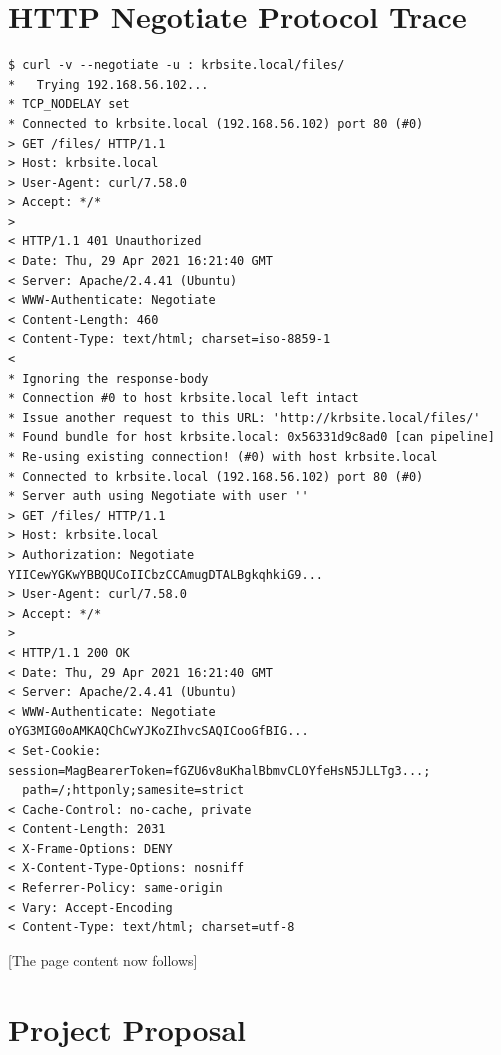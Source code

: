 \documentclass[12pt]{report}
\begin{document}
\chapter{HTTP Negotiate Protocol Trace}
\label{sec:appendix4}

\begin{verbatim}
$ curl -v --negotiate -u : krbsite.local/files/
*   Trying 192.168.56.102...
* TCP_NODELAY set
* Connected to krbsite.local (192.168.56.102) port 80 (#0)
> GET /files/ HTTP/1.1
> Host: krbsite.local
> User-Agent: curl/7.58.0
> Accept: */*
>
< HTTP/1.1 401 Unauthorized
< Date: Thu, 29 Apr 2021 16:21:40 GMT
< Server: Apache/2.4.41 (Ubuntu)
< WWW-Authenticate: Negotiate
< Content-Length: 460
< Content-Type: text/html; charset=iso-8859-1
<
* Ignoring the response-body
* Connection #0 to host krbsite.local left intact
* Issue another request to this URL: 'http://krbsite.local/files/'
* Found bundle for host krbsite.local: 0x56331d9c8ad0 [can pipeline]
* Re-using existing connection! (#0) with host krbsite.local
* Connected to krbsite.local (192.168.56.102) port 80 (#0)
* Server auth using Negotiate with user ''
> GET /files/ HTTP/1.1
> Host: krbsite.local
> Authorization: Negotiate YIICewYGKwYBBQUCoIICbzCCAmugDTALBgkqhkiG9...
> User-Agent: curl/7.58.0
> Accept: */*
>
< HTTP/1.1 200 OK
< Date: Thu, 29 Apr 2021 16:21:40 GMT
< Server: Apache/2.4.41 (Ubuntu)
< WWW-Authenticate: Negotiate oYG3MIG0oAMKAQChCwYJKoZIhvcSAQICooGfBIG...
< Set-Cookie: session=MagBearerToken=fGZU6v8uKhalBbmvCLOYfeHsN5JLLTg3...;
  path=/;httponly;samesite=strict
< Cache-Control: no-cache, private
< Content-Length: 2031
< X-Frame-Options: DENY
< X-Content-Type-Options: nosniff
< Referrer-Policy: same-origin
< Vary: Accept-Encoding
< Content-Type: text/html; charset=utf-8
\end{verbatim}
[The page content now follows]

\chapter{Project Proposal}

\end{document}

